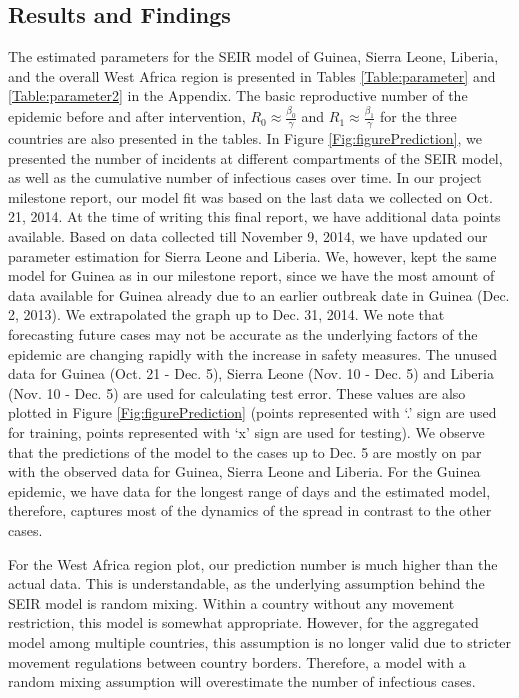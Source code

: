 \documentclass[10pt, journal,onecolumn]{IEEEtran}
\begin{document}
\subsection{Results and Findings} The estimated parameters for the SEIR model of Guinea, Sierra
Leone, Liberia, and the overall West Africa region is presented in Tables \ref{Table:parameter} and
\ref{Table:parameter2} in the Appendix. The basic reproductive number of the epidemic before and after
intervention, $R_0 \approx \frac{\beta_0}{\gamma}$  and $R_1 \approx \frac{\beta_1}{\gamma}$ for the
three countries are also presented in the tables. In Figure \ref{Fig:figurePrediction}, we presented
the number of incidents at different compartments of the SEIR model, as well as the cumulative
number of infectious cases over time. In our project milestone report, our model fit was based on
the last data we collected on Oct. 21, 2014. At the time of writing this final report, we have
additional data points available. Based on data collected till November 9, 2014, we have updated our
parameter estimation for Sierra Leone and Liberia. We, however, kept the same model for Guinea as in
our milestone report, since we have the most amount of data available for Guinea already due to an
earlier outbreak date in Guinea (Dec. 2, 2013). We extrapolated the graph up to Dec. 31, 2014.  We
note that forecasting future cases may not be accurate as the underlying factors of the epidemic are
changing rapidly with the increase in safety measures. The unused data for Guinea (Oct. 21 - Dec.
5), Sierra Leone (Nov. 10 - Dec. 5) and Liberia (Nov. 10 - Dec. 5) are used for calculating test
error. These values are also plotted in Figure \ref{Fig:figurePrediction} (points represented with
`.' sign are used for training, points represented with `x' sign are used for testing). We observe
that the predictions of the model to the cases up to Dec. 5 are mostly on par with the observed data
for Guinea, Sierra Leone and Liberia. For the Guinea epidemic, we have data for the longest range of
days and the estimated model, therefore, captures most of the dynamics of the spread in contrast to
the other cases.

For the West Africa region plot, our prediction number is much higher than the actual data. This is
understandable, as the underlying assumption behind the SEIR model is random mixing.  Within a
country without any movement restriction, this model is somewhat appropriate. However, for the
aggregated model among multiple countries, this assumption is no longer valid due to stricter
movement regulations between country borders. Therefore, a model with a random mixing assumption
will overestimate the number of infectious cases.
\end{document}
